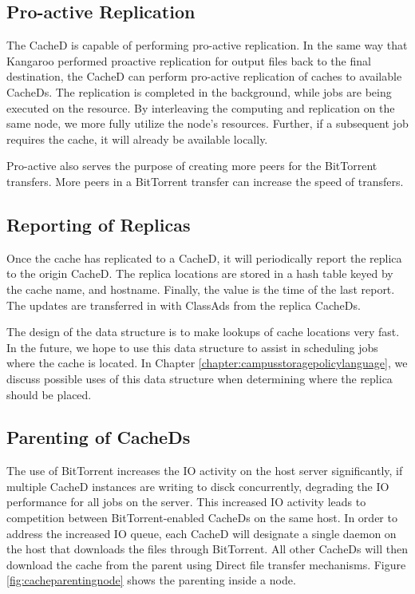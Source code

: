 \subsection{Pro-active Replication}
The CacheD is capable of performing pro-active replication.  In the same way that Kangaroo performed proactive replication for output files back to the final destination, the CacheD can perform pro-active replication of caches to available CacheDs.  The replication is completed in the background, while jobs are being executed on the resource.  By interleaving the computing and replication on the same node, we more fully utilize the node's resources.  Further, if a subsequent job requires the cache, it will already be available locally.

Pro-active also serves the purpose of creating more peers for the BitTorrent transfers.  More peers in a BitTorrent transfer can increase the speed of transfers.



\subsection{Reporting of Replicas}

Once the cache has replicated to a CacheD, it will periodically report the replica to the origin CacheD.  The replica locations are stored in a hash table keyed by the cache name, and hostname.  Finally, the value is the time of the last report.  The updates are transferred in with ClassAds from the replica CacheDs.

The design of the data structure is to make lookups of cache locations very fast.  In the future, we hope to use this data structure to assist in scheduling jobs where the cache is located.  In Chapter \ref{chapter:campusstoragepolicylanguage}, we discuss possible uses of this data structure when determining where the replica should be placed.  



\subsection{Parenting of CacheDs} \label{sec:cachedparenting}
The use of BitTorrent increases the IO activity on the host server significantly, if multiple CacheD instances are writing to disck concurrently, degrading the IO performance for all jobs on the server.  This increased IO activity leads to competition between BitTorrent-enabled CacheDs on the same host.  In order to address the increased IO queue, each CacheD will designate a single daemon on the host that downloads the files through BitTorrent.  All other CacheDs will then download the cache from the parent using Direct file transfer mechanisms.  Figure \ref{fig:cacheparentingnode} shows the parenting inside a node. 

